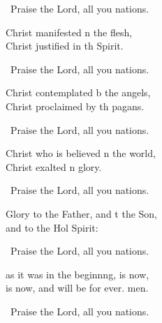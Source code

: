 \medskip\begin{psalmverse}%
\begin{patverse}
\resp\ Praise the Lord, all you nations.

Christ manifested \pointup{\i}n the flesh,\Med\\
Christ justified in th Spirit.

\resp\ Praise the Lord, all you nations.

Christ contemplated b the angels,\Med\\
Christ proclaimed by th pagans.

\resp\ Praise the Lord, all you nations.

Christ who is believed \pointup{\i}n the world,\Med\\
Christ exalted \pointup{\i}n glory.

\resp\ Praise the Lord, all you nations.

Glory to the Father, and t the Son,\Med\\
and to the Hol Spirit:

\resp\ Praise the Lord, all you nations.

as it was in the beginn\pointup{\i}ng, is now,\Med\\
is now, and will be for ever. men.

\resp\ Praise the Lord, all you nations.
\end{patverse}
\end{psalmverse}
